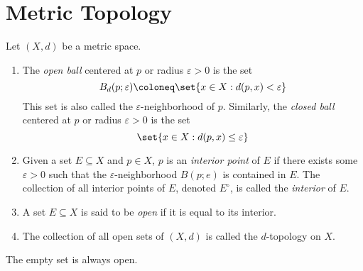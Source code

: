 \section{Metric Topology} \label{sec:topology}
\begin{definition*}
    Let $(X, d)$ be a metric space.
    \begin{enumerate}
        \item The \emph{open ball} centered at $p$ or radius
        $\varepsilon > 0$ is the set \[
            B_d(p; \varepsilon) \coloneq \set{x \in X : d(p, x)
                < \varepsilon}
        \] This set is also called the $\varepsilon$-neighborhood of $p$.
        Similarly, the \emph{closed ball} centered at $p$ or radius
        $\varepsilon > 0$ is the set \[
            \set{x \in X : d(p, x) \le \varepsilon}
        \]
        \item Given a set $E \subseteq X$ and $p \in X$, $p$ is an
        \emph{interior point} of $E$ if there exists some $\varepsilon > 0$
        such that the $\varepsilon$-neighborhood $B(p; e)$ is contained in
        $E$.
        The collection of all interior points of $E$, denoted $E^\circ$, is
        called the \emph{interior} of $E$.
        \item A set $E \subseteq X$ is said to be \emph{open} if it is
        equal to its interior.
        \item The collection of all open sets of $(X, d)$ is called the
        $d$-topology on $X$.
    \end{enumerate}
\end{definition*}

\begin{remark}
    The empty set is always open.
\end{remark}


